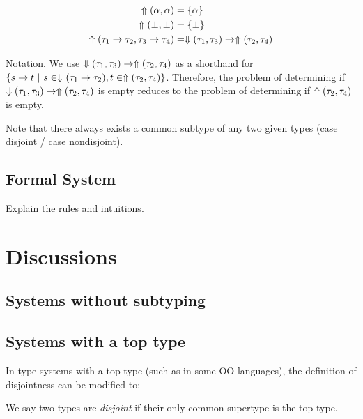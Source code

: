 \documentclass[nocopyrightspace,preprint,times,9pt]{sigplanconf}
\begin{document}
\begin{align*}
  \Uparrow(\alpha,\alpha) &= \{ \alpha \} \\
  \Uparrow(\bot,\bot) &= \{ \bot \} \\
  \Uparrow(\tau_1 \to \tau_2, \tau_3 \to \tau_4) &= \Downarrow(\tau_1,\tau_3) \to \Uparrow(\tau_2,\tau_4) \\
\end{align*}

Notation. We use $\Downarrow(\tau_1,\tau_3) \to \Uparrow(\tau_2,\tau_4)$ as a shorthand for $\{ s \to t ~|~ s \in \Downarrow(\tau_1 \to \tau_2), t \in \Uparrow(\tau_2,\tau_4) \}$. Therefore, the problem of determining if $\Downarrow(\tau_1,\tau_3) \to \Uparrow(\tau_2,\tau_4)$ is empty reduces to the problem of determining if $\Uparrow(\tau_2,\tau_4)$ is empty.

Note that there always exists a common subtype of any two given types (case disjoint / case nondisjoint).

\subsection{Formal System}

Explain the rules and intuitions.

\section{Discussions}

\subsection{Systems without subtyping}

\subsection{Systems with a top type}

In type systems with a top type (such as \lstinline@Object@ in some OO languages), the definition of disjointness can be modified to:

We say two types are \emph{disjoint} if their only common supertype is the top type.









%

\clearpage
\onecolumn
\appendix



\end{document}
